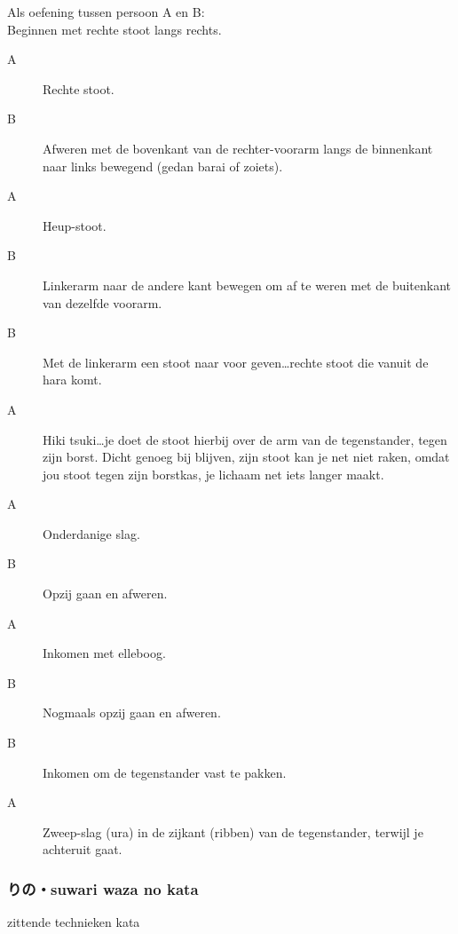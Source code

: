 Als oefening tussen persoon A en B:\\
Beginnen met rechte stoot langs rechts.\\
\begin{description}
\item [A] Rechte stoot.
\item [B] Afweren met de bovenkant van de rechter-voorarm langs de binnenkant naar links bewegend (gedan barai of zoiets).
\item [A] Heup-stoot.
\item [B] Linkerarm naar de andere kant bewegen om af te weren met de buitenkant van dezelfde voorarm.
\item [B] Met de linkerarm een stoot naar voor geven\ldots rechte stoot die vanuit de hara komt.
\item [A] Hiki tsuki\ldots je doet de stoot hierbij over de arm van de tegenstander, tegen zijn borst. Dicht genoeg bij blijven, zijn stoot kan je net niet raken, omdat jou stoot tegen zijn borstkas, je lichaam net iets langer maakt.
\item [A] Onderdanige slag.
\item [B] Opzij gaan en afweren.
\item [A] Inkomen met elleboog.
\item [B] Nogmaals opzij gaan en afweren.
\item [B] Inkomen om de tegenstander vast te pakken.
\item [A] Zweep-slag (ura) in de zijkant (ribben) van de tegenstander, terwijl je achteruit gaat.
\end{description}

\subsubsection{りの・suwari waza no kata}
zittende technieken kata

